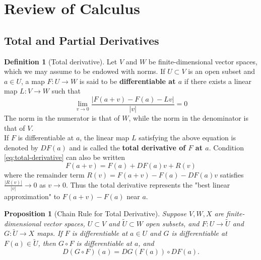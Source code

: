 \documentclass[reqno]{amsart}
\theoremstyle{plain}%
\newtheorem{proposition}[theorem]{Proposition}
\theoremstyle{definition}
\newtheorem{definition}[theorem]{Definition}
\theoremstyle{remark}
\begin{document}
    



\newpage
\appendix
\section{Review of Calculus}
    \subsection*{Total and Partial Derivatives}
        \begin{definition}[Total derivative]
        Let $V$ and $W$ be finite-dimensional vector spaces, which we may assume to
        be endowed with norms. If $U \subset V$ is an open subset and
        $a \in U$, a map $F  \colon U \to W$ is said to be \textbf{differentiable
        at $a$} if there exists a linear map $L  \colon V \to W$ such that
        \begin{equation}
        \lim_{v \to 0} \frac{\left| F(a+v) - F(a) - Lv \right| }{\left| v \right|
        }=0 \label{eq:total-derivative}
        \end{equation}
        The norm in the numerator is that of $W$, while the norm in the denominator
        is that of $V$.\\
        If $F$ is differentiable at $a$, the linear map $L$ satisfying the above
        equation is denoted by $DF(a)$ and is called the \textbf{total derivative
        of $F$ at $a$}. Condition \eqref{eq:total-derivative} can also be written
        \[
        F(a+v) = F(a) + DF(a)v + R(v)
        \] 
        where the remainder term $R(v) = F(a+v) - F(a) - DF(a)v$ satisfies
        $\frac{\left| R(v) \right| }{\left| v \right| }\to 0$ as $v \to 0$. Thus
        the total derivative represents the "best linear approximation" to
        $F(a+v) - F(a)$ near $a$.
        \end{definition}

        \begin{proposition}[Chain Rule for Total
        Derivative]\label{chain-rule-total-derivative}
        Suppose $V,W,X$ are finite-dimensional vector spaces, $U \subset V$ and
        $\tilde{U}\subset W$ open subsets, and $F  \colon U \to \tilde{U}$ and
        $G  \colon \tilde{U} \to X$ maps. If $F$ is differentiable at
        $a \in U$ and $G$ is differentiable at $F(a) \in \tilde{U}$, then
        $G \circ F$ is differentiable at $a$, and
        \[
        D\left( G \circ F \right) (a) = DG\left( F(a) \right) \circ DF(a).
        \] 
        \end{proposition}
\end{document}
